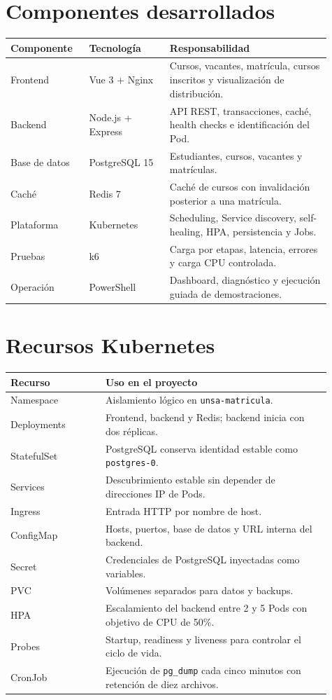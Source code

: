 \documentclass[12pt,a4paper]{article}
\begin{document}
\section{Componentes desarrollados}
\begin{longtable}{p{0.22\linewidth}p{0.23\linewidth}p{0.46\linewidth}}
\toprule
Componente & Tecnología & Responsabilidad \\
\midrule
Frontend & Vue 3 + Nginx & Cursos, vacantes, matrícula, cursos inscritos y visualización de distribución. \\
Backend & Node.js + Express & API REST, transacciones, caché, health checks e identificación del Pod. \\
Base de datos & PostgreSQL 15 & Estudiantes, cursos, vacantes y matrículas. \\
Caché & Redis 7 & Caché de cursos con invalidación posterior a una matrícula. \\
Plataforma & Kubernetes & Scheduling, Service discovery, self-healing, HPA, persistencia y Jobs. \\
Pruebas & k6 & Carga por etapas, latencia, errores y carga CPU controlada. \\
Operación & PowerShell & Dashboard, diagnóstico y ejecución guiada de demostraciones. \\
\bottomrule
\end{longtable}

\section{Recursos Kubernetes}
\begin{longtable}{p{0.27\linewidth}p{0.64\linewidth}}
\toprule
Recurso & Uso en el proyecto \\
\midrule
Namespace & Aislamiento lógico en \texttt{unsa-matricula}. \\
Deployments & Frontend, backend y Redis; backend inicia con dos réplicas. \\
StatefulSet & PostgreSQL conserva identidad estable como \texttt{postgres-0}. \\
Services & Descubrimiento estable sin depender de direcciones IP de Pods. \\
Ingress & Entrada HTTP por nombre de host. \\
ConfigMap & Hosts, puertos, base de datos y URL interna del backend. \\
Secret & Credenciales de PostgreSQL inyectadas como variables. \\
PVC & Volúmenes separados para datos y backups. \\
HPA & Escalamiento del backend entre 2 y 5 Pods con objetivo de CPU de 50\%. \\
Probes & Startup, readiness y liveness para controlar el ciclo de vida. \\
CronJob & Ejecución de \texttt{pg\_dump} cada cinco minutos con retención de diez archivos. \\
\bottomrule
\end{longtable}
\end{document}

